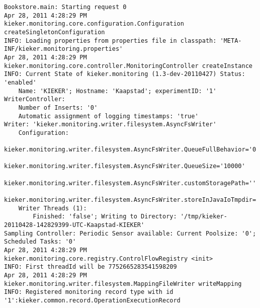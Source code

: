 \setTextListing
\begin{lstlisting}[caption=Execution of the Bookstore with AspectJ trace instrumentation (Section~\ref{sec:traceAnalysis:instr:AspectJ})]
Bookstore.main: Starting request 0
Apr 28, 2011 4:28:29 PM kieker.monitoring.core.configuration.Configuration createSingletonConfiguration
INFO: Loading properties from properties file in classpath: 'META-INF/kieker.monitoring.properties'
Apr 28, 2011 4:28:29 PM kieker.monitoring.core.controller.MonitoringController createInstance
INFO: Current State of kieker.monitoring (1.3-dev-20110427) Status: 'enabled'
	Name: 'KIEKER'; Hostname: 'Kaapstad'; experimentID: '1'
WriterController:
	Number of Inserts: '0'
	Automatic assignment of logging timestamps: 'true'
Writer: 'kieker.monitoring.writer.filesystem.AsyncFsWriter'
	Configuration:
		kieker.monitoring.writer.filesystem.AsyncFsWriter.QueueFullBehavior='0'
		kieker.monitoring.writer.filesystem.AsyncFsWriter.QueueSize='10000'
		kieker.monitoring.writer.filesystem.AsyncFsWriter.customStoragePath=''
		kieker.monitoring.writer.filesystem.AsyncFsWriter.storeInJavaIoTmpdir='true'
	Writer Threads (1): 
		Finished: 'false'; Writing to Directory: '/tmp/kieker-20110428-142829399-UTC-Kaapstad-KIEKER'
Sampling Controller: Periodic Sensor available: Current Poolsize: '0'; Scheduled Tasks: '0'
Apr 28, 2011 4:28:29 PM kieker.monitoring.core.registry.ControlFlowRegistry <init>
INFO: First threadId will be 7752665283541598209
Apr 28, 2011 4:28:29 PM kieker.monitoring.writer.filesystem.MappingFileWriter writeMapping
INFO: Registered monitoring record type with id '1':kieker.common.record.OperationExecutionRecord
\end{lstlisting}


